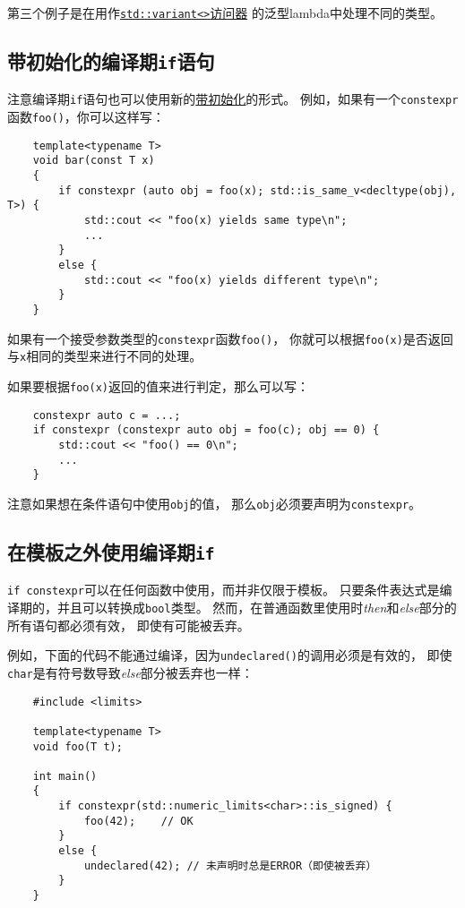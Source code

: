 第三个例子是在用作\hyperref[ch16.3.3.2]{\texttt{std::variant<>}访问器}
的泛型lambda中处理不同的类型。

\subsection{带初始化的编译期\texttt{if}语句}
注意编译期\texttt{if}语句也可以使用新的\hyperref[ch2]{带初始化}的形式。
例如，如果有一个\texttt{constexpr}函数\texttt{foo()}，你可以这样写：
\begin{lstlisting}
    template<typename T>
    void bar(const T x)
    {
        if constexpr (auto obj = foo(x); std::is_same_v<decltype(obj), T>) {
            std::cout << "foo(x) yields same type\n";
            ...
        }
        else {
            std::cout << "foo(x) yields different type\n";
        }
    }
\end{lstlisting}
如果有一个接受参数类型的\texttt{constexpr}函数\texttt{foo()}，
你就可以根据\texttt{foo(x)}是否返回与\texttt{x}相同的类型来进行不同的处理。

如果要根据\texttt{foo(x)}返回的值来进行判定，那么可以写：
\begin{lstlisting}
    constexpr auto c = ...;
    if constexpr (constexpr auto obj = foo(c); obj == 0) {
        std::cout << "foo() == 0\n";
        ...
    }
\end{lstlisting}
注意如果想在条件语句中使用\texttt{obj}的值，
那么\texttt{obj}必须要声明为\texttt{constexpr}。

\subsection{在模板之外使用编译期\texttt{if}}
\texttt{if constexpr}可以在任何函数中使用，而并非仅限于模板。
只要条件表达式是编译期的，并且可以转换成\texttt{bool}类型。
然而，在普通函数里使用时\emph{then}和\emph{else}部分的所有语句都必须有效，
即使有可能被丢弃。

例如，下面的代码不能通过编译，因为\texttt{undeclared()}的调用必须是有效的，
即使\texttt{char}是有符号数导致\emph{else}部分被丢弃也一样：
\begin{lstlisting}
    #include <limits>

    template<typename T>
    void foo(T t);

    int main()
    {
        if constexpr(std::numeric_limits<char>::is_signed) {
            foo(42);    // OK
        }
        else {
            undeclared(42); // 未声明时总是ERROR（即使被丢弃）
        }
    }
\end{lstlisting}

